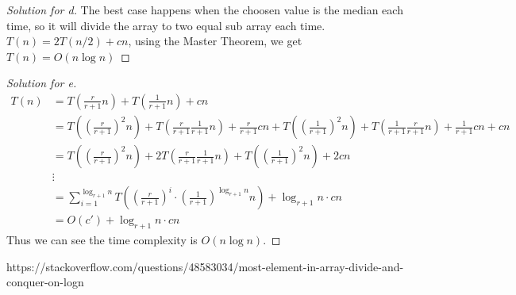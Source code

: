\documentclass[12pt]{article}
\begin{document}
\begin{proof}[Solution for d]
	The best case happens when the choosen value is the median each time, so it will divide the array to two equal sub array each time. $T(n) = 2T(n/2) + cn$, using the Master Theorem, we get $T(n) = O(n\log n)$
\end{proof}

\begin{proof}[Solution for e]
	\begin{align*}
		T(n)&=T(\frac{r}{r+1}n)+T(\frac{1}{r+1}n)+cn\\
		&=T((\frac{r}{r+1})^2n)+T(\frac{r}{r+1}\frac{1}{r+1}n)+\frac{r}{r+1}cn+T((\frac{1}{r+1})^2n)+T(\frac{1}{r+1}\frac{r}{r+1}n)+\frac{1}{r+1}cn+cn\\
		&=T((\frac{r}{r+1})^2n)+2T(\frac{r}{r+1}\frac{1}{r+1}n)+T((\frac{1}{r+1})^2n)+2cn\\
		&\vdots\\
		&=\sum_{i=1}^{\log_{r+1}n}T((\frac{r}{r+1})^i \cdot (\frac{1}{r+1})^{\log_{r+1}n}n) + \log_{r+1}n\cdot cn\\
		&=O(c')+ \log_{r+1}n\cdot cn
	\end{align*}
	Thus we can see the time complexity is $O(n\log n)$.
\end{proof}

\bigskip




\begin{thebibliography}{so}
 https://stackoverflow.com/questions/48583034/most-element-in-array-divide-and-conquer-on-logn
\end{thebibliography}
\end{document}

